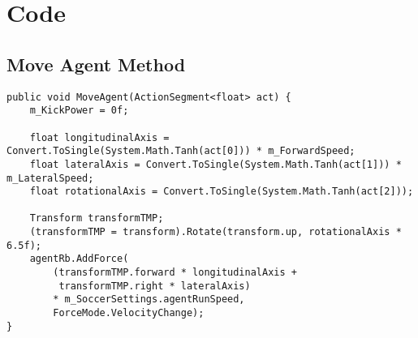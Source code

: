 
\chapter{Code}\label{appendix:code}
\section{Move Agent Method}\label{appendix:code:move_agent}
\begin{lstlisting}[basicstyle=\footnotesize]
public void MoveAgent(ActionSegment<float> act) {
    m_KickPower = 0f;

    float longitudinalAxis = Convert.ToSingle(System.Math.Tanh(act[0])) * m_ForwardSpeed;
    float lateralAxis = Convert.ToSingle(System.Math.Tanh(act[1])) * m_LateralSpeed;
    float rotationalAxis = Convert.ToSingle(System.Math.Tanh(act[2]));

    Transform transformTMP;
    (transformTMP = transform).Rotate(transform.up, rotationalAxis * 6.5f);
    agentRb.AddForce(
        (transformTMP.forward * longitudinalAxis +
         transformTMP.right * lateralAxis)
        * m_SoccerSettings.agentRunSpeed,
        ForceMode.VelocityChange);
}
\end{lstlisting}